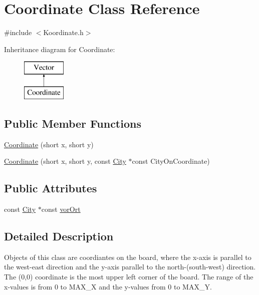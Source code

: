 \hypertarget{class_coordinate}{\section{Coordinate Class Reference}
\label{class_coordinate}
}


{\ttfamily \#include $<$Koordinate.\-h$>$}

Inheritance diagram for Coordinate\-:\begin{figure}[H]
\begin{center}
\leavevmode
\includegraphics[height=2.000000cm]{class_coordinate}
\end{center}
\end{figure}
\subsection*{Public Member Functions}
\begin{DoxyCompactItemize}
\item 
\hyperlink{class_coordinate_afa539ca7218f25717e25482babf0bfc9}{Coordinate} (short x, short y)
\item 
\hyperlink{class_coordinate_ad60539c2d440527e34f4ab23a85c8389}{Coordinate} (short x, short y, const \hyperlink{class_city}{City} $\ast$const City\-On\-Coordinate)
\end{DoxyCompactItemize}
\subsection*{Public Attributes}
\begin{DoxyCompactItemize}
\item 
const \hyperlink{class_city}{City} $\ast$const \hyperlink{class_coordinate_aa8e26100ecf4f1c45555a7cb14f6364e}{vor\-Ort}
\end{DoxyCompactItemize}


\subsection{Detailed Description}
Objects of this class are coordiantes on the board, where the x-\/axis is parallel to the west-\/east direction and the y-\/axis parallel to the north-\/(south-\/west) direction. The (0,0) coordinate is the most upper left corner of the board. The range of the x-\/values is from 0 to M\-A\-X\-\_\-\-X and the y-\/values from 0 to M\-A\-X\-\_\-\-Y. 

